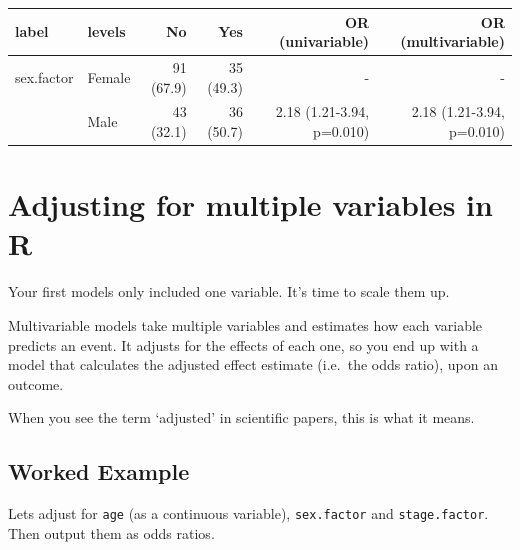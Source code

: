 \documentclass[]{book}
\makeatletter
\newenvironment{Shaded}{\begin{snugshade}}{\end{snugshade}}
\newcommand{\KeywordTok}[1]{\textcolor[rgb]{0.13,0.29,0.53}{\textbf{#1}}}
\newcommand{\StringTok}[1]{\textcolor[rgb]{0.31,0.60,0.02}{#1}}
\newcommand{\OperatorTok}[1]{\textcolor[rgb]{0.81,0.36,0.00}{\textbf{#1}}}
\newcommand{\NormalTok}[1]{#1}
\newenvironment{kframe}{%
\medskip{}
\setlength{\fboxsep}{.8em}
 \def\at@end@of@kframe{}%
 \ifinner\ifhmode%
  \def\at@end@of@kframe{\end{minipage}}%
  \begin{minipage}{\columnwidth}%
 \fi\fi%
 \def\FrameCommand##1{\hskip\@totalleftmargin \hskip-\fboxsep
 \colorbox{shadecolor}{##1}\hskip-\fboxsep
     \hskip-\linewidth \hskip-\@totalleftmargin \hskip\columnwidth}%
 \MakeFramed {\advance\hsize-\width
   \@totalleftmargin\z@ \linewidth\hsize
   \@setminipage}}%
 {\par\unskip\endMakeFramed%
 \at@end@of@kframe}
\renewenvironment{Shaded}{\begin{kframe}}{\end{kframe}}
\makeatother
\begin{document}
\begin{Shaded}
\end{Shaded}

\begin{tabular}{l|l|r|r|r|r}
\hline
label & levels & No & Yes & OR (univariable) & OR (multivariable)\\
\hline
sex.factor & Female & 91 (67.9) & 35 (49.3) & - & -\\
\hline
 & Male & 43 (32.1) & 36 (50.7) & 2.18 (1.21-3.94, p=0.010) & 2.18 (1.21-3.94, p=0.010)\\
\hline
\end{tabular}

\newpage

\section{Adjusting for multiple variables in
R}\label{adjusting-for-multiple-variables-in-r}

Your first models only included one variable. It's time to scale them
up.

Multivariable models take multiple variables and estimates how each
variable predicts an event. It adjusts for the effects of each one, so
you end up with a model that calculates the adjusted effect estimate
(i.e.~the odds ratio), upon an outcome.

When you see the term `adjusted' in scientific papers, this is what it
means.

\subsection{Worked Example}\label{worked-example-2}

Lets adjust for \texttt{age} (as a continuous variable),
\texttt{sex.factor} and \texttt{stage.factor}. Then output them as odds
ratios.

\begin{Shaded}
\end{Shaded}
\end{document}
